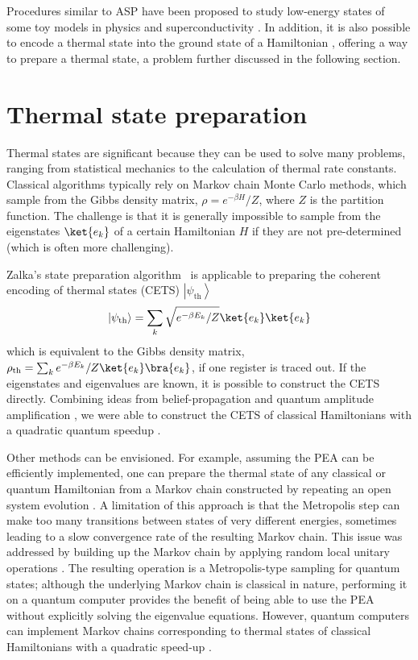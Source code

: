 \documentclass[11pt,oneside,final]{huthesis}%
\begin{document}
Procedures similar to ASP have been proposed to study low-energy states of some
toy models in physics \cite{Oh08} and superconductivity \cite{Wu02}.  In addition, it is
also possible to encode a thermal state into the ground state of a Hamiltonian
\cite{Somma07}, offering a way to prepare a thermal state, a
problem further discussed in the following section.

\section{Thermal state preparation}\label{sec:thermal}

Thermal states
are significant because they can be used to solve many problems, ranging
from statistical mechanics to the calculation of thermal rate constants.
Classical algorithms typically rely on Markov chain Monte Carlo methods,
which sample from the Gibbs density matrix, $\rho  = e^{ - \beta H} /Z$, where
$Z$ is the partition function. The challenge is that it is generally impossible
to sample from the eigenstates $\ket{e_k}$ of a certain Hamiltonian $H$ if they
are not pre-determined (which is often more challenging).

Zalka's state preparation algorithm~\cite{Zalka98} is applicable to
preparing the coherent encoding of thermal states (CETS) $\left| {\psi
_\mathrm{th} } \right\rangle $
\begin{equation}
\left| {\psi _\mathrm{th} } \right\rangle  = \sum\limits_k {\sqrt {e^{ - \beta
E_k } /Z} } \ket{e_k}\ket{e_k} 
\end{equation}
which is equivalent to the Gibbs density matrix, $\rho _\mathrm{th}  =
\sum\nolimits_k {e^{ - \beta E_k } /Z} \ket{e_k}\bra{e_k}$, if one register is
traced out. If the eigenstates and eigenvalues are known, it is possible to
construct the CETS directly. Combining ideas
from belief-propagation \cite{Mezard09} and quantum amplitude amplification
\cite{Kaye07}, we were able to construct the CETS of classical Hamiltonians
with a quadratic quantum speedup \cite{Yung10}.

Other methods can be envisioned.  For example, assuming the PEA can be efficiently implemented, one can
prepare the thermal state of any classical or quantum Hamiltonian from a Markov
chain constructed by repeating an open system evolution \cite{Terhal00}. A
limitation of this approach is that the Metropolis step can make too many
transitions between states of very different energies, sometimes leading to a
slow convergence rate of the resulting Markov chain. This issue was addressed by
building up the Markov chain by applying random local unitary operations
\cite{Temme11}. The resulting operation is a Metropolis-type sampling for
quantum states; although the underlying Markov chain is classical in nature,
performing it on a quantum computer provides the benefit of being able to use
the PEA without explicitly solving the eigenvalue equations. However, quantum
computers can implement Markov chains corresponding to thermal states of
classical Hamiltonians with a quadratic speed-up \cite{Szegedy04, Somma08,
Wocjan08, Poulin09,Poulin09a,Chiang10}.
\end{document}
